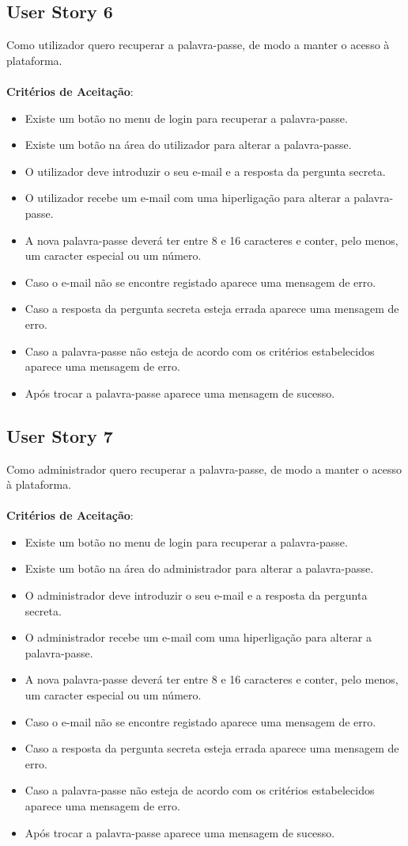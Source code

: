 \documentclass[a4paper,11pt]{article}
\begin{document}
\subsection{User Story 6}
Como utilizador quero recuperar a palavra-passe, de modo a manter o acesso à plataforma.\\\\
\textbf{Critérios de Aceitação}:
\begin{itemize}
  \item Existe um botão no menu de login para recuperar a palavra-passe.
  \item Existe um botão na área do utilizador para alterar a palavra-passe.
  \item O utilizador deve introduzir o seu e-mail e a resposta da pergunta secreta.
  \item O utilizador recebe um e-mail com uma hiperligação para alterar a palavra-passe.
  \item A nova palavra-passe deverá ter entre 8 e 16 caracteres e conter, pelo menos, um caracter especial ou um número.
  \item Caso o e-mail não se encontre registado aparece uma mensagem de erro.
  \item Caso a resposta da pergunta secreta esteja errada aparece uma mensagem de erro.
  \item Caso a palavra-passe não esteja de acordo com os critérios estabelecidos aparece uma mensagem de erro.
  \item Após trocar a palavra-passe aparece uma mensagem de sucesso.
\end{itemize}

\subsection{User Story 7}
Como administrador quero recuperar a palavra-passe, de modo a manter o acesso à plataforma.\\\\
\textbf{Critérios de Aceitação}:
\begin{itemize}
  \item Existe um botão no menu de login para recuperar a palavra-passe.
  \item Existe um botão na área do administrador para alterar a palavra-passe.
  \item O administrador deve introduzir o seu e-mail e a resposta da pergunta secreta.
  \item O administrador recebe um e-mail com uma hiperligação para alterar a palavra-passe.
  \item A nova palavra-passe deverá ter entre 8 e 16 caracteres e conter, pelo menos, um caracter especial ou um número.
  \item Caso o e-mail não se encontre registado aparece uma mensagem de erro.
  \item Caso a resposta da pergunta secreta esteja errada aparece uma mensagem de erro.
  \item Caso a palavra-passe não esteja de acordo com os critérios estabelecidos aparece uma mensagem de erro.
  \item Após trocar a palavra-passe aparece uma mensagem de sucesso.
\end{itemize}
\end{document}
